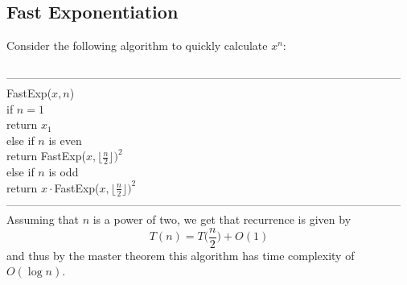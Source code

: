 \documentclass{article}
\newcommand{\x}{\cdot}
\newcommand{\floor}[1]{\lfloor #1 \rfloor}
\begin{document}
\subsection{Fast Exponentiation}
Consider the following algorithm to quickly calculate $x^n$:\\\\
---------------------------------------------------------------------------------------------------------
FastExp($x, n$)\\
	\hspace*{7mm} if $n=1$\\
	\hspace*{14mm} return $x_1$\\
	\hspace*{7mm} else if $n$ is even\\
	\hspace*{14mm} return FastExp($x, \floor{\frac{n}{2}})^2$\\
	\hspace*{7mm} else if $n$ is odd\\
	\hspace*{14mm} return $x\x$FastExp($x, \floor{\frac{n}{2}})^2$\\
---------------------------------------------------------------------------------------------------------\\
Assuming that $n$ is a power of two, we get that recurrence is given by
\[T(n) = T\Big(\frac{n}{2}\Big) + O(1)\]
and thus by the master theorem this algorithm has time complexity of $O(\log n)$.
\end{document}
